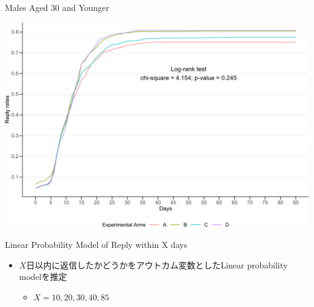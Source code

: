 \documentclass[
      aspectratio=169,
        12pt,
    ]{beamer}
\providecommand{\tightlist}{%
  \setlength{\itemsep}{0pt}\setlength{\parskip}{0pt}}
\begin{document}
\begin{frame}{Males Aged 30 and Younger}
\protect\hypertarget{males-aged-30-and-younger}{}
\begin{center}\includegraphics[width=0.75\linewidth]{report_files/figure-beamer/plot-surv-male-under30-1} \end{center}
\end{frame}

\begin{frame}{Linear Probability Model of Reply within X days}
\protect\hypertarget{linear-probability-model-of-reply-within-x-days}{}
\begin{itemize}
\tightlist
\item
  \(X\)日以内に返信したかどうかをアウトカム変数としたLinear probability modelを推定

  \begin{itemize}
  \tightlist
  \item
    \(X = 10, 20, 30, 40, 85\)
  \end{itemize}
\end{itemize}
\end{frame}
\end{document}
